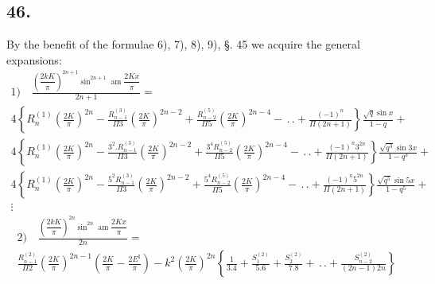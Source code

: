 \documentclass{article}
\begin{document}
\subsection*{46.}
By the benefit of the formulae 6), 7), 8), 9), §. 45 we acquire the general expansions:
\[
\begin{gathered}
\text{1)}\quad\frac{\left(\dfrac{2kK}{\pi}\right)^{2n+1}\sin^{2n+1}\operatorname{am}\dfrac{2Kx}{\pi}}{2n+1}=\\[1.5ex]
4\left\{R_{n}^{(1)}\left(\frac{2K}{\pi}\right)^{2n}-\frac{R_{n-1}^{(3)}}{\Pi 3}\left(\frac{2K}{\pi}\right)^{2n-2}+\frac{R_{n-2}^{(5)}}{\Pi 5}\left(\frac{2K}{\pi}\right)^{2n-4}-\,.\,.+\frac{(-1)^{n}}{\Pi(2n+1)}\right\}\frac{\sqrt{q}\sin x}{1-q}+\\[1.5ex]
4\left\{R_{n}^{(1)}\left(\frac{2K}{\pi}\right)^{2n}-\frac{3^{2}.R_{n-1}^{(3)}}{\Pi 3}\left(\frac{2K}{\pi}\right)^{2n-2}+\frac{3^{4}R_{n-2}^{(5)}}{\Pi 5}\left(\frac{2K}{\pi}\right)^{2n-4}-\,.\,.+\frac{(-1)^{n}3^{2n}}{\Pi(2n+1)}\right\}\frac{\sqrt{q^{3}}\sin 3x}{1-q^{3}}+\\[1.5ex]
4\left\{R_{n}^{(1)}\left(\frac{2K}{\pi}\right)^{2n}-\frac{5^{2}R_{n-1}^{(3)}}{\Pi 3}\left(\frac{2K}{\pi}\right)^{2n-2}+\frac{5^{4}R_{n-2}^{(5)}}{\Pi 5}\left(\frac{2K}{\pi}\right)^{2n-4}-\,.\,.+\frac{(-1)^{n}5^{2n}}{\Pi(2n+1)}\right\}\frac{\sqrt{q^{5}}\sin 5x}{1-q^{5}}+\\[1.5ex]
\vdots
\end{gathered}
\]
\[
\begin{gathered}
\text{2)}\quad\frac{\left(\dfrac{2kK}{\pi}\right)^{2n}\sin^{2n}\operatorname{am}\dfrac{2Kx}{\pi}}{2n}=\\[1.5ex]
\frac{R_{n-1}^{(2)}}{\Pi 2}\left(\frac{2K}{\pi}\right)^{2n-1}\left(\frac{2K}{\pi}-\frac{2E^{\mathrm{I}}}{\pi}\right)-k^{2}\left(\frac{2K}{\pi}\right)^{2n}\left\{\frac{1}{3.4}+\frac{S_{1}^{(2)}}{5.6}+\frac{S_{2}^{(2)}}{7.8}+\,.\,.+\frac{S_{n-2}^{(2)}}{(2n-1)2n}\right\}
\end{gathered}
\]
\end{document}

